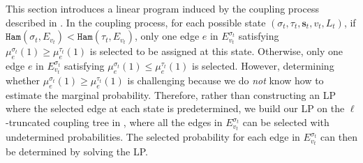 \documentclass[11pt]{article}
\def\!#1{\mathtt{#1}}
\newcommand{\seqS}{\boldsymbol{s}}
\begin{document}
This section introduces a linear program induced by the coupling process described in .
In the coupling process, for each possible state $(\sigma_t,\tau_t,\seqS_t,v_t,L_t)$, if ${\!{Ham}\left(\sigma_t, {E_{v_t}}\right)} < {\!{Ham}\left(\tau_t, {E_{v_t}}\right)}$,
only one edge $e$ in $E_{v_t}^{\sigma_t}$ satisfying $\mu^{\sigma_t}_e(1) \geq \mu^{\tau_t}_e(1)$ is selected to be assigned at this state.
Otherwise, only one edge $e$ in $E_{v_t}^{\sigma_t}$ satisfying $\mu^{\sigma_t}_e(1) \leq \mu^{\tau_t}_e(1)$ is selected.
However, determining whether $\mu^{\sigma_t}_e(1) \geq \mu^{\tau_t}_e(1)$ is challenging 
because we do \emph{not} know how to estimate the marginal probability.
Therefore, rather than constructing an LP where the selected edge at each state is predetermined,
we build our LP on the $\ell$-truncated coupling tree in ,
where all the edges in $E_{v_t}^{\sigma_t}$ can be selected with undetermined probabilities.
The selected probability for each edge in $E_{v_t}^{\sigma_t}$
can then be determined by solving the LP.

\end{document}

